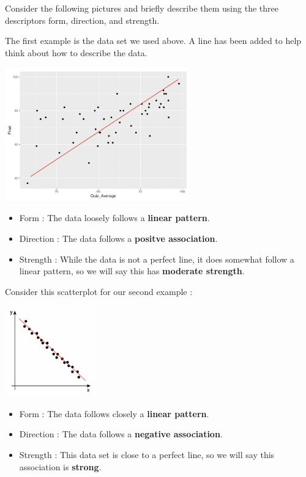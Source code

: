 \documentclass[
  letterpaper,
  DIV=11,
  numbers=noendperiod]{scrreprt}
\providecommand{\tightlist}{%
  \setlength{\itemsep}{0pt}\setlength{\parskip}{0pt}}\usepackage{longtable,booktabs,array}
\begin{document}
Consider the following pictures and briefly describe them using the
three descriptors form, direction, and strength.

The first example is the data set we used above. A line has been added
to help think about how to describe the data.

\includegraphics[width=0.6\textwidth,height=\textheight]{./images/SC_1.jpg}

\begin{itemize}
\tightlist
\item
  Form : The data loosely follows a \textbf{linear pattern}.
\item
  Direction : The data follows a \textbf{positve association}.
\item
  Strength : While the data is not a perfect line, it does somewhat
  follow a linear pattern, so we will say this has \textbf{moderate
  strength}.
\end{itemize}

Consider this scatterplot for our second example :

\includegraphics[width=0.3\textwidth,height=\textheight]{./images/SC_2.jpg}

\begin{itemize}
\tightlist
\item
  Form : The data follows closely a \textbf{linear pattern}.
\item
  Direction : The data follows a \textbf{negative association}.
\item
  Strength : This data set is close to a perfect line, so we will say
  this association is \textbf{strong}.
\end{itemize}
\end{document}
